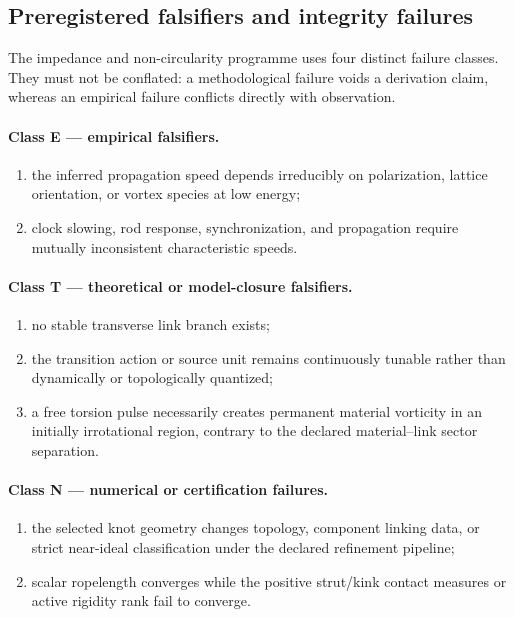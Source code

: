 \documentclass[11pt]{article}
\theoremstyle{definition}
\theoremstyle{plain}
\theoremstyle{remark}
\begin{document}
\subsection{Preregistered falsifiers and integrity failures}
\label{subsec:genesis_preregistered_falsifiers}

The impedance and non-circularity programme uses four distinct failure classes.
They must not be conflated: a methodological failure voids a derivation claim,
whereas an empirical failure conflicts directly with observation.

\paragraph{Class E --- empirical falsifiers.}
\begin{enumerate}
    \item the inferred propagation speed depends irreducibly on polarization,
    lattice orientation, or vortex species at low energy;
    \item clock slowing, rod response, synchronization, and propagation require
    mutually inconsistent characteristic speeds.
\end{enumerate}

\paragraph{Class T --- theoretical or model-closure falsifiers.}
\begin{enumerate}
    \item no stable transverse link branch exists;
    \item the transition action or source unit remains continuously tunable
    rather than dynamically or topologically quantized;
    \item a free torsion pulse necessarily creates permanent material vorticity
    in an initially irrotational region, contrary to the declared material--link
    sector separation.
\end{enumerate}

\paragraph{Class N --- numerical or certification failures.}
\begin{enumerate}
    \item the selected knot geometry changes topology, component linking data,
    or strict near-ideal classification under the declared refinement pipeline;
    \item scalar ropelength converges while the positive strut/kink contact
    measures or active rigidity rank fail to converge.
\end{enumerate}
\end{document}
